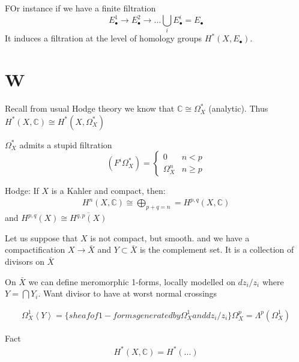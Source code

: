 FOr instance if we have a finite filtration 
\begin{equation}
    E_\bullet ^{1} \rightarrow     
    E_\bullet ^{2} \rightarrow     
    \dots 
    \bigcup_ i E_\bullet ^{i}  = E_\bullet 
\end{equation}
It induces a filtration at the level of homology groups $H^* ( X, E_\bullet) $. 




\section{W} %

Recall from usual Hodge theory we know that $ \mathbb{C} \cong \Omega_X ^* $ (analytic). 
Thus $H^*(X, \mathbb{C} ) \cong H^* ( X, \Omega_X ^* ) $ 

$\Omega_X ^ * $ admits a stupid filtration 
\begin{equation}
    (F^i \Omega_X ^* ) = \begin{cases} 
        0 & n<p \\
        \Omega_X ^n & n \geq p 
    \end{cases} 
\end{equation}

Hodge: If $ X$ is a Kahler and compact, then: 
\begin{align}
    H^n ( X, \mathbb{C} ) \cong \bigoplus_{p+q = n } = H^{p,q} ( X, \mathbb{C} ) 
\end{align}
and $ H^{p,q} ( X) \cong \overline{ H^{q,p} ( X) } $  

Let us suppose that $ X$ is not compact, but smooth. 
and we have a compactification $ X \rightarrow \bar{X} $ 
and $Y \subset \bar{X} $ is the complement set. 
It is a collection of divisors on $\bar{X} $ 

On $ \bar{X} $ we can define meromorphic 1-forms,
locally modelled on $ dz_i/z_i $ where $ Y = \bigcap Y_i $. 
Want divisor to have at worst normal crossings 

\begin{definition}
    \begin{align}
        \Omega_X ^ 1 \left< Y \right> = \{ sheaf of 1-forms generated by \Omega_X ^1 and dz_i / z_i \}
        \Omega_X ^p = \Lambda ^p ( \Omega_X ^1 ) 
    \end{align}


\end{definition}

Fact 
\begin{align}
    H^*  ( X, \mathbb{C}  ) = H^*  ( ...) 
\end{align}

